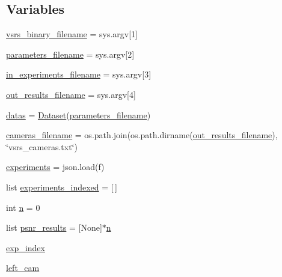 \subsection*{Variables}
\begin{DoxyCompactItemize}
\item 
\hyperlink{namespacepsnr__experiments_a5deb1c458380e20e1f7ada545e800a33}{vsrs\+\_\+binary\+\_\+filename} = sys.\+argv\mbox{[}1\mbox{]}
\item 
\hyperlink{namespacepsnr__experiments_a0232c22d1dfe44a97729ae546b058128}{parameters\+\_\+filename} = sys.\+argv\mbox{[}2\mbox{]}
\item 
\hyperlink{namespacepsnr__experiments_a32f07a4a298cf1838c1266dcbb7c768f}{in\+\_\+experiments\+\_\+filename} = sys.\+argv\mbox{[}3\mbox{]}
\item 
\hyperlink{namespacepsnr__experiments_a2b33b493337c179f491d18d3a4febdbf}{out\+\_\+results\+\_\+filename} = sys.\+argv\mbox{[}4\mbox{]}
\item 
\hyperlink{namespacepsnr__experiments_ad1579004777449df35b7cd0424133b10}{datas} = \hyperlink{classpylib_1_1dataset_1_1Dataset}{Dataset}(\hyperlink{namespacepsnr__experiments_a0232c22d1dfe44a97729ae546b058128}{parameters\+\_\+filename})
\item 
\hyperlink{namespacepsnr__experiments_a493d7ff5bdc4bfa915290d691912964f}{cameras\+\_\+filename} = os.\+path.\+join(os.\+path.\+dirname(\hyperlink{namespacepsnr__experiments_a2b33b493337c179f491d18d3a4febdbf}{out\+\_\+results\+\_\+filename}), \char`\"{}vsrs\+\_\+cameras.\+txt\char`\"{})
\item 
\hyperlink{namespacepsnr__experiments_ae848e8dc4a88ad45dc8f4fc578a145a3}{experiments} = json.\+load(f)
\item 
list \hyperlink{namespacepsnr__experiments_a6d491e2a38ac5e79f929cbe85e195d5f}{experiments\+\_\+indexed} = \mbox{[}$\,$\mbox{]}
\item 
int \hyperlink{namespacepsnr__experiments_a95bd6fade9f6e50f91daf28b20ab6d33}{n} = 0
\item 
list \hyperlink{namespacepsnr__experiments_a891f44706ebab018824dda78fa13840d}{psnr\+\_\+results} = \mbox{[}None\mbox{]}$\ast$\hyperlink{namespacepsnr__experiments_a95bd6fade9f6e50f91daf28b20ab6d33}{n}
\item 
\hyperlink{namespacepsnr__experiments_ac658a4900340b7cee6bed9c8e0fafe26}{exp\+\_\+index}
\item 
\hyperlink{namespacepsnr__experiments_a73bc4364dfa07a7d47d805235227b20b}{left\+\_\+cam}
\item 

\end{DoxyCompactItemize}
